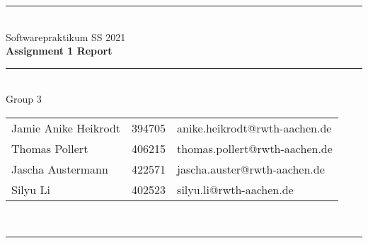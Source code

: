 \documentclass[a4paper,12pt]{article}
\begin{document}
\begin{center}
	\rule{\textwidth}{0.1pt}\\[1cm]
	
	\Large Softwarepraktikum SS 2021\\\bf Assignment 1 Report %
\end{center}


\begin{center}

	\rule{\textwidth}{0.1pt}\\[0.5cm]

	{\Large Group 3\\[5mm]} %

	\begin{tabular}{lll}
		Jamie Anike Heikrodt & 394705 & anike.heikrodt@rwth-aachen.de \\

		Thomas Pollert & 406215 & thomas.pollert@rwth-aachen.de \\
		
		Jascha Austermann & 422571 & jascha.auster@rwth-aachen.de \\

		Silyu Li & 402523 & silyu.li@rwth-aachen.de \\

	\end{tabular}\\[0.5cm]

	\rule{\textwidth}{0.1pt}\\[1cm]
	
\end{center}

\newpage
\tableofcontents






\end{document}
